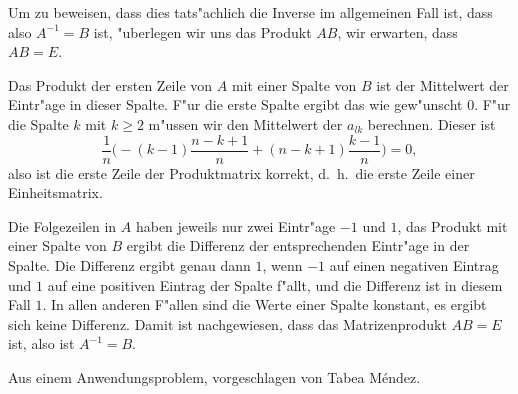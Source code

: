 \begin{loesung}
\begin{teilaufgaben}
Um zu beweisen, dass dies tats"achlich die Inverse im allgemeinen Fall ist,
dass also $A^{-1}=B$ ist, "uberlegen wir uns das Produkt $AB$,
wir erwarten, dass $AB=E$. 

Das Produkt der ersten Zeile von $A$ mit einer Spalte von $B$ ist der
Mittelwert der Eintr"age in dieser Spalte.
F"ur die erste Spalte ergibt das wie gew"unscht $0$.
F"ur die Spalte $k$ mit $k\ge 2$ m"ussen wir den Mittelwert der $a_{lk}$ berechnen.
Dieser ist
\[
\frac1n\biggl(-(k-1)\frac{n-k+1}n+(n-k+1)\frac{k-1}n\biggr)
=0,
\]
also ist die erste Zeile der Produktmatrix korrekt, d.~h.~die erste Zeile
einer Einheitsmatrix.

Die Folgezeilen in $A$ haben jeweils nur zwei Eintr"age $-1$ und $1$,
das Produkt mit einer Spalte von $B$ ergibt die Differenz der entsprechenden
Eintr"age in der Spalte. Die Differenz ergibt genau dann $1$, wenn $-1$ 
auf einen negativen Eintrag und $1$ auf eine positiven Eintrag der Spalte
f"allt, und die Differenz ist in diesem Fall $1$.
In allen anderen F"allen sind die Werte einer Spalte konstant, es ergibt sich
keine Differenz.
Damit ist nachgewiesen, dass das Matrizenprodukt $AB=E$ ist, also ist
$A^{-1}=B$.
\end{teilaufgaben}
\end{loesung}

\begin{diskussion}
Aus einem Anwendungsproblem, vorgeschlagen von Tabea M\'endez.
\end{diskussion}

